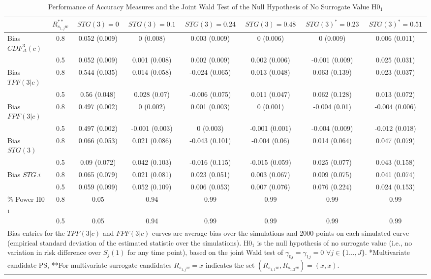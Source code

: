 \documentclass[times, doublespace]{simauth}
\begin{document}
\begin{table}
\begin{center}
\caption{Performance of Accuracy Measures and the Joint Wald Test of the Null Hypothesis of No Surrogate Value H0$_1$ \label{Bias}}
\begin{tabular}{lccccccc}
  \hline
&$R_{s_{1,j}w}^{**}$&$STG(3)=0$ & $STG(3)=0.1$  & $STG(3)=0.24$  & $STG(3)=0.48$&$STG(3)^{*}=0.23$&$STG(3)^{*}=0.51$\\ 
  \hline
Bias $CDF^{3}_{\Delta}(c)$& 0.8& 0.052 (0.009) & 0 (0.008) & 0.003 (0.009) & 0 (0.006) & 0 (0.009) & 0.006 (0.011) \\ 
 &0.5& 0.052 (0.009) & 0.001 (0.008) & 0.002 (0.009) & 0.002 (0.006) & -0.001 (0.009) & 0.025 (0.031) \\ 
Bias $TPF(3|c)$& 0.8& 0.544 (0.035) & 0.014 (0.058) & -0.024 (0.065) & 0.013 (0.048) & 0.063 (0.139) & 0.023 (0.037) \\ 
 &0.5& 0.56 (0.048) & 0.028 (0.07) & -0.006 (0.075) & 0.011 (0.047) & 0.062 (0.128) & 0.013 (0.072) \\ 
Bias $FPF(3|c)$& 0.8& 0.497 (0.002) & 0 (0.002) & 0.001 (0.003) & 0 (0.001) & -0.004 (0.01) & -0.004 (0.006) \\ 
 &0.5& 0.497 (0.002) & -0.001 (0.003) & 0 (0.003) & -0.001 (0.001) & -0.004 (0.009) & -0.012 (0.018) \\ 
Bias $STG(3)$& 0.8& 0.066 (0.053) & 0.021 (0.086) & -0.043 (0.101) & -0.004 (0.06) & 0.014 (0.064) & 0.047 (0.079) \\
  &0.5 & 0.09 (0.072) & 0.042 (0.103) & -0.016 (0.115) & -0.015 (0.059) & 0.025 (0.077) & 0.043 (0.158) \\ 
Bias $STG.i$ & 0.8 & 0.065 (0.079)& 0.021 (0.081)& 0.023 (0.051)& 0.003 (0.067) & 0.009 (0.075) & 0.041 (0.074) \\
 & 0.5 & 0.059 (0.099) & 0.052 (0.109) & 0.006 (0.053)& 0.007 (0.076)& 0.076 (0.224) & 0.024 (0.153) \\
\% Power H0$_1$& 0.8& 0.05 & 0.94 & 0.99 & 0.99 & 0.99 & 0.99 \\ 
  &0.5& 0.05 & 0.94 & 0.99 & 0.99 & 0.99 & 0.99 \\ 
   \hline
\multicolumn{8}{p{9in}}{Bias entries for the $TPF(3|c)$ and $FPF(3|c)$ curves are average bias over the simulations and 2000 points on each simulated curve (empirical standard deviation of the estimated statistic over the simulations). H0$_1$ is the null hypothesis of no surrogate value (i.e., no variation in risk difference over $S_j(1)$ for any time point), based on the joint Wald test of $\gamma_{0j}=\gamma_{1j}=0$ $\forall j\in\{1\ldots,J\}$. *Multivariate candidate PS, **For multivariate surrogate candidates $R_{s_{1,j}w}=x$ indicates the set $(R_{s_{1,1}w},R_{s_{1,2}w})=(x,x)$.}
\end{tabular}
\end{center}
\end{table}
\end{document}
